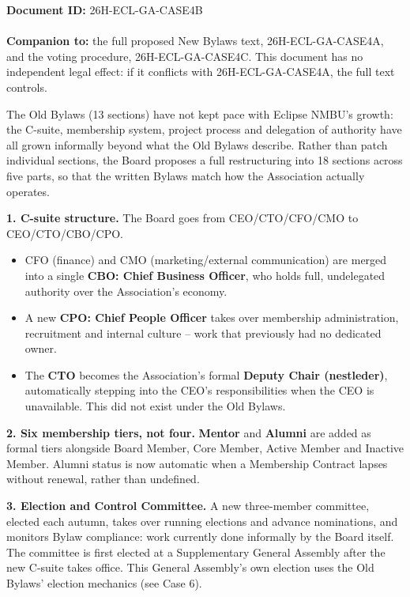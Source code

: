 \documentclass{../../../Common/Latex/Templates/rapport}
\date{\meetingdate, \meetingtime}
\begin{document}
\makecoverpage
\tableofcontents
\reportmainmatter

\noindent\textbf{Document ID:} 26H-ECL-GA-CASE4B\\
\meetingline\\
\textbf{Companion to:} the full proposed New Bylaws text, 26H-ECL-GA-CASE4A, and the voting procedure, 26H-ECL-GA-CASE4C. This document has no independent legal effect: if it conflicts with 26H-ECL-GA-CASE4A, the full text controls.

The Old Bylaws (13 sections) have not kept pace with Eclipse NMBU's growth: the C-suite, membership system, project process and delegation of authority have all grown informally beyond what the Old Bylaws describe. Rather than patch individual sections, the Board proposes a full restructuring into 18 sections across five parts, so that the written Bylaws match how the Association actually operates.


\textbf{1. C-suite structure.} The Board goes from CEO/CTO/CFO/CMO to CEO/CTO/CBO/CPO.
\begin{itemize}
  \item CFO (finance) and CMO (marketing/external communication) are merged into a single \textbf{CBO: Chief Business Officer}, who holds full, undelegated authority over the Association's economy.
  \item A new \textbf{CPO: Chief People Officer} takes over membership administration, recruitment and internal culture -- work that previously had no dedicated owner.
  \item The \textbf{CTO} becomes the Association's formal \textbf{Deputy Chair (nestleder)}, automatically stepping into the CEO's responsibilities when the CEO is unavailable. This did not exist under the Old Bylaws.
\end{itemize}

\textbf{2. Six membership tiers, not four.} \textbf{Mentor} and \textbf{Alumni} are added as formal tiers alongside Board Member, Core Member, Active Member and Inactive Member. Alumni status is now automatic when a Membership Contract lapses without renewal, rather than undefined.

\textbf{3. Election and Control Committee.} A new three-member committee, elected each autumn, takes over running elections and advance nominations, and monitors Bylaw compliance: work currently done informally by the Board itself. The committee is first elected at a Supplementary General Assembly after the new C-suite takes office. This General Assembly's own election uses the Old Bylaws' election mechanics (see Case 6).
\end{document}
